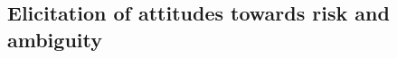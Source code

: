 \documentclass[]{article}
\begin{document}
\subsection{Elicitation of attitudes towards risk and ambiguity}










\pagebreak


\end{document}
